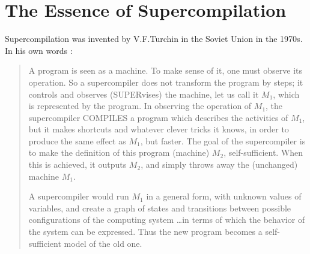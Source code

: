 \section{The Essence of Supercompilation}
\label{sec:idea}

Supercompilation was invented by V.F.Turchin in the Soviet Union in the 1970s. 
In his own words \cite{Turchin1986Supercompiler}:
\begin{quote}
A program is seen as a machine.
To make sense of it, one must observe its operation. So a supercompiler does not transform the
program by steps; it controls and observes (SUPERvises) the machine, let us call it $M_1$, which is
represented by the program. In observing the operation of $M_1$, the supercompiler COMPILES a
program which describes the activities of $M_1$, but it makes shortcuts and whatever clever tricks
it knows, in order to produce the same effect as $M_1$, but faster. The goal of the supercompiler is
to make the definition of this program (machine) $M_2$, self-sufficient. When this is achieved, it
outputs $M_2$, and simply throws away the (unchanged) machine $M_1$.

A supercompiler would run $M_1$ in a general
form, with unknown values of variables, and create a graph of states and transitions between
possible configurations of the computing system \ldots in terms of which the behavior of the system
can be expressed. Thus the new program becomes a self-sufficient model of the old one.
\end{quote}


